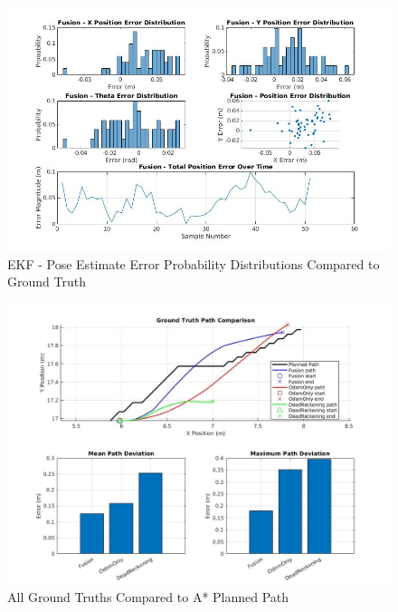 \documentclass[
  letterpaper,
  DIV=11,
  numbers=noendperiod]{scrartcl}
\begin{document}
\begin{figure}

{\centering \includegraphics{ekf-error.png}

}

\caption{\label{fig-ekf-error}EKF - Pose Estimate Error Probability
Distributions Compared to Ground Truth}

\end{figure}

\begin{figure}

{\centering \includegraphics{all-ground-truths.png}

}

\caption{\label{fig-all-ground-truths}All Ground Truths Compared to A*
Planned Path}

\end{figure}
\end{document}
